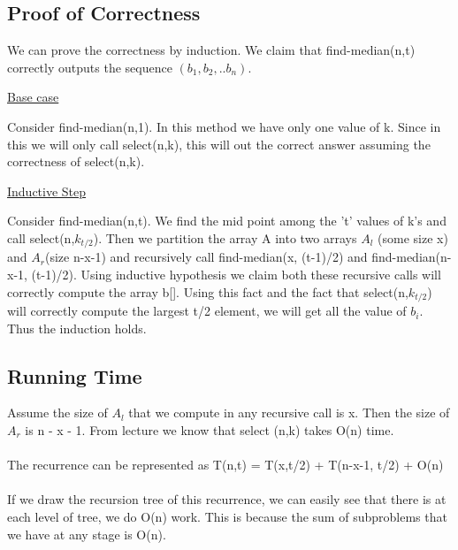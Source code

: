 \documentclass[12pt]{article}
\begin{document}
\subsection{Proof of Correctness}

We can prove the correctness by induction. 
We claim that find-median(n,t) correctly outputs the sequence $(b_1, b_2,..b_n)$.


\underline{Base case}

Consider find-median(n,1). In this method we  have only one value of k. Since in this we will only call select(n,k), this will out the correct answer assuming the correctness of select(n,k).

\underline{Inductive Step}

Consider find-median(n,t). We find the mid point among the 't' values of k's and call select(n,$k_{t/2}$). Then we partition the array A into two arrays $A_{l}$ (some size x) and $A_{r}$(size n-x-1) and recursively call find-median(x, (t-1)/2) and find-median(n-x-1, (t-1)/2). Using inductive hypothesis we claim both these recursive calls will correctly compute the array b[]. Using this fact and the fact that select(n,$k_{t/2}$) will correctly compute the largest t/2 element, we will get all the value of $b_i$. Thus the induction holds.

\subsection{Running Time}

Assume the size of $A_l$ that we compute in any recursive call is x. Then the size of $A_r$ is n - x - 1. From lecture we know that select (n,k) takes O(n) time. \\\\
The recurrence can be represented as T(n,t) = T(x,t/2) + T(n-x-1, t/2) + O(n)
\\\\
If we draw the recursion tree of this recurrence, we can easily see that there is at each level of tree, we do O(n) work. This is because the sum of subproblems that we have at any stage is O(n).
\end{document}
